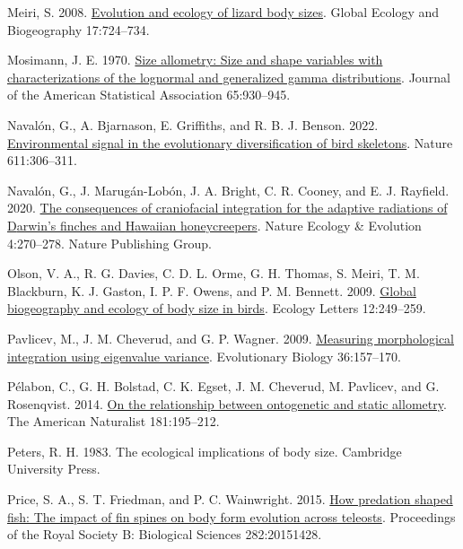 \documentclass[
  11pt,
]{article}
\newlength{\cslhangindent}
\newlength{\cslentryspacingunit} %
\newenvironment{CSLReferences}[2] %
 {%
  \setlength{\parindent}{0pt}
  \ifodd #1
  \let\oldpar\par
  \def\par{\hangindent=\cslhangindent\oldpar}
  \fi
  \setlength{\parskip}{#2\cslentryspacingunit}
 }%
 {}
\begin{document}
\begin{CSLReferences}{1}{0}
\leavevmode{}%
Meiri, S. 2008.
\href{https://doi.org/10.1111/j.1466-8238.2008.00414.x}{Evolution and
ecology of lizard body sizes}. Global Ecology and Biogeography
17:724--734.

\leavevmode{}%
Mosimann, J. E. 1970.
\href{https://doi.org/10.1080/01621459.1970.10481136}{Size allometry:
Size and shape variables with characterizations of the lognormal and
generalized gamma distributions}. Journal of the American Statistical
Association 65:930--945.

\leavevmode{}%
Navalón, G., A. Bjarnason, E. Griffiths, and R. B. J. Benson. 2022.
\href{https://doi.org/10.1038/s41586-022-05372-y}{{Environmental signal
in the evolutionary diversification of bird skeletons}}. Nature
611:306--311.

\leavevmode{}%
Navalón, G., J. Marugán-Lobón, J. A. Bright, C. R. Cooney, and E. J.
Rayfield. 2020. \href{https://doi.org/10.1038/s41559-019-1092-y}{The
consequences of craniofacial integration for the adaptive radiations of
{D}arwin's finches and {H}awaiian honeycreepers}. Nature Ecology \&
Evolution 4:270--278. Nature Publishing Group.

\leavevmode{}%
Olson, V. A., R. G. Davies, C. D. L. Orme, G. H. Thomas, S. Meiri, T. M.
Blackburn, K. J. Gaston, I. P. F. Owens, and P. M. Bennett. 2009.
\href{https://doi.org/10.1111/j.1461-0248.2009.01281.x}{Global
biogeography and ecology of body size in birds}. Ecology Letters
12:249--259.

\leavevmode{}%
Pavlicev, M., J. M. Cheverud, and G. P. Wagner. 2009.
\href{https://doi.org/10.1007/s11692-008-9042-7}{Measuring morphological
integration using eigenvalue variance}. Evolutionary Biology
36:157--170.

\leavevmode{}%
Pélabon, C., G. H. Bolstad, C. K. Egset, J. M. Cheverud, M. Pavlicev,
and G. Rosenqvist. 2014. \href{https://doi.org/10.1086/668820}{On the
relationship between ontogenetic and static allometry}. The American
Naturalist 181:195--212.

\leavevmode{}%
Peters, R. H. 1983. The ecological implications of body size. Cambridge
University Press.

\leavevmode{}%
Price, S. A., S. T. Friedman, and P. C. Wainwright. 2015.
\href{https://doi.org/10.1098/rspb.2015.1428}{How predation shaped fish:
The impact of fin spines on body form evolution across teleosts}.
Proceedings of the Royal Society B: Biological Sciences 282:20151428.


\end{CSLReferences}
\end{document}
